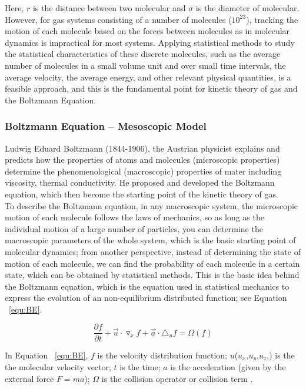 Here, $r$ is the distance between two molecular and $\sigma$ is the diameter of molecular.\\

However, for gas systems consisting of a number of molecules ($10^{23}$), tracking the motion of each molecule based on the forces between molecules as in molecular dynamics is impractical for most systems. Applying statistical methods to study the statistical characteristics of these discrete molecules, such as the average number of molecules in a small volume unit and over small time intervals, the average velocity, the average energy, and other relevant physical quantities, is a feasible approach, and this is the fundamental point for kinetic theory of gas and the Boltzmann Equation.

\subsubsection{Boltzmann Equation -- Mesoscopic Model}
Ludwig Eduard Boltzmann (1844-1906), the Austrian physicist explains and predicts how the properties of atoms and molecules (microscopic properties) determine the phenomenological (macroscopic) properties of mater including viscosity, thermal conductivity\cite{lbmmbook}. He proposed and developed the Boltzmann equation, which then become the starting point of the kinetic theory of gas.\\

To describe the Boltzmann equation, in any macroscopic system, the microscopic motion of each molecule follows the laws of mechanics, so as long as the individual motion of a large number of particles, you can determine the macroscopic parameters of the whole system, which is the basic starting point of molecular dynamics; from another perspective, instead of determining the state of motion of each molecule, we can find the probability of each molecule in a certain state, which can be obtained by statistical methods. This is the basic idea behind the Boltzmann equation, which is the equation used in statistical mechanics to express the evolution of an non-equilibrium distributed function; see Equation ~\ref{equ:BE}.

\begin{equation}
\label{equ:BE}
    \frac {\partial f}{\partial t} + \vec u \cdot \triangledown _x f + \vec a \cdot \triangle _ u f = \Omega (f)
\end{equation}

In Equation ~\ref{equ:BE}, $f$ is the velocity distribution function; $u$($u_x$,$u_y$,$u_z$,) is the the molecular velocity vector; $t$ is the time; $a$ is the acceleration (given by the external force $F=ma$); $\Omega$ is the collision operator or collision term \cite{succi2001lattice}.\\

